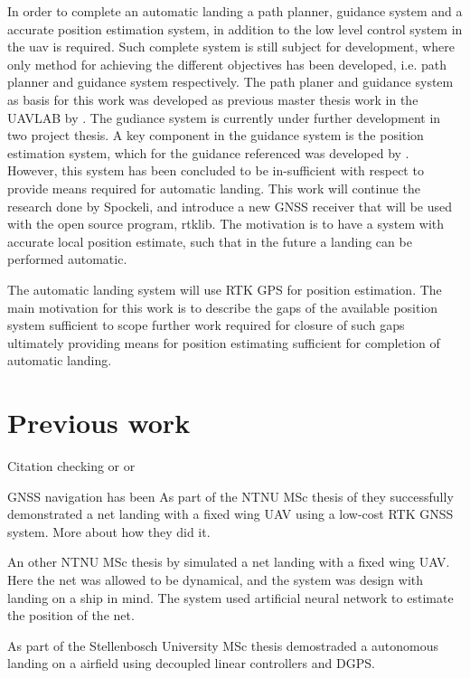 In order to complete an automatic landing a path planner, guidance system and a accurate position estimation system, in addition to the low level control system in the \gls{uav} is required. Such complete system is still subject for development, where only method for achieving the different objectives has been developed, i.e. path planner and guidance system respectively. The path planer and guidance system as basis for this work was developed as previous master thesis work in the UAVLAB by \citep{Froelich}. The gudiance system is currently under further development in two project thesis. A key component in the guidance system is the position estimation system, which for the guidance referenced was developed by \citep{Spockeli}. However, this system has been concluded to be in-sufficient with respect to provide means required for automatic landing. This work will continue the research done by Spockeli, and introduce a new GNSS receiver that will be used with the open source program, rtklib. The motivation is to have a system with accurate local position estimate, such that in the future a landing can be performed automatic.

The automatic landing system will use RTK GPS for position estimation. The main motivation for this work is to describe the gaps of the available position system sufficient to scope further work required for closure of such gaps ultimately providing means for position estimating sufficient for completion of automatic landing.
\section{Previous work}
Citation checking \citep{Spockeli,Froelich} or \cite{Spockeli,Froelich} or \citet{Spockeli,Froelich}

GNSS navigation has been
As part of the NTNU MSc thesis of \citep{Skulstad&Syversen} they successfully demonstrated a net landing with a fixed wing UAV using a low-cost RTK GNSS system. More about how they did it.

An other NTNU MSc thesis by \citep{Spockeli} simulated a net landing with a fixed wing UAV. Here the net was allowed to be dynamical, and the system was design with landing on a ship in mind. The system used artificial neural network to estimate the position of the net.

As part of the Stellenbosch University MSc thesis \citep{smit2013autonomous} demostraded a autonomous landing on a airfield using decoupled linear controllers and DGPS. 


